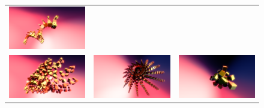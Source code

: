 \begin{enumerate}
\begin{figure}
\begin{tabular}{ccc}
\includegraphics[scale=0.17]{images/array3-3} \tabularnewline
\includegraphics[scale=0.17]{images/array3-4} &
\includegraphics[scale=0.17]{images/array3-5} &
\includegraphics[scale=0.17]{images/array3-6} \tabularnewline

\end{tabular}
\end{figure}
\end{enumerate}
